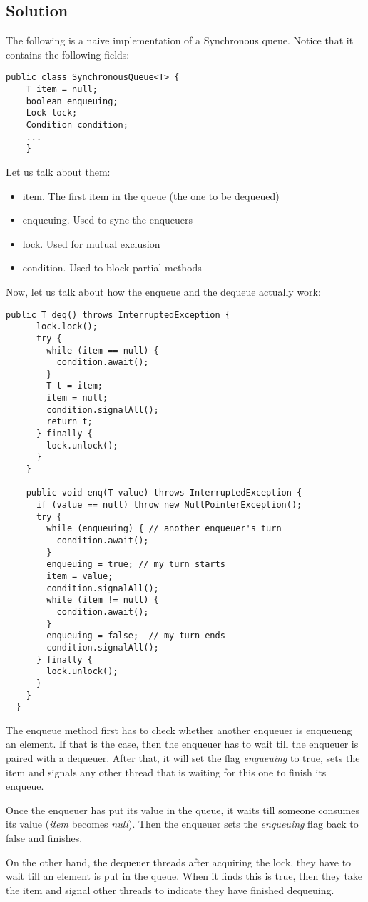 \subsection{Solution}
\par
The following is a naive implementation of a Synchronous queue. Notice that it
contains the following fields:
\par
\hfill
\begin{lstlisting}[style=numbers]
  public class SynchronousQueue<T> {
    T item = null;
    boolean enqueuing;
    Lock lock;
    Condition condition;
	...
	}
\end{lstlisting}
\hfill
\par
Let us talk about them:
\begin{itemize}
\item item. The first item in the queue (the one to be dequeued)
\item enqueuing. Used to sync the enqueuers
\item lock. Used for mutual exclusion
\item condition. Used to block partial methods
\end{itemize}
\par
Now, let us talk about how the enqueue and the dequeue actually work:
\par
\hfill
\begin{lstlisting}[style=numbers]
    public T deq() throws InterruptedException {
      lock.lock();
      try {
        while (item == null) {
          condition.await();
        }
        T t = item;
        item = null;
        condition.signalAll();
        return t;
      } finally {
        lock.unlock();
      }
    }

    public void enq(T value) throws InterruptedException {
      if (value == null) throw new NullPointerException();
      try {
        while (enqueuing) { // another enqueuer's turn
          condition.await();
        }
        enqueuing = true; // my turn starts
        item = value;
        condition.signalAll();
        while (item != null) {
          condition.await();
        }
        enqueuing = false;  // my turn ends
        condition.signalAll();
      } finally {
        lock.unlock();
      }
    }
  }
\end{lstlisting}
\hfill
\par
The enqueue method first has to check whether another enqueuer is enqueueng an
element. If that is the case, then the enqueuer has to wait till the enqueuer
is paired with a dequeuer. After that, it will set the flag \textit{enqueuing}
to true, sets the item and signals any other thread that is waiting for this
one to finish its enqueue. 
\par
Once the enqueuer has put its value in the queue, it waits till someone
consumes its value (\textit{item} becomes \textit{null}). Then the enqueuer
sets the \textit{enqueuing} flag back to false and finishes.
\par
On the other hand, the dequeuer threads after acquiring the lock, they have to
wait till an element is put in the queue. When it finds this is true, then they
take the item and signal other threads to indicate they have finished
dequeuing.
\par
